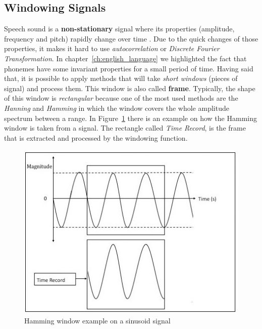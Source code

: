 \subsection{Windowing Signals}
\label{ssubs:windowing_signals}
Speech sound is a \textbf{non-stationary} signal where its properties (amplitude, frequency and pitch) rapidly change over time \cite{windowing_fi}. Due to the quick changes of those properties, it makes it hard to use \textit{autocorrelation} or \textit{Discrete Fourier Transformation}. In chapter~\ref{ch:english_language} we highlighted the fact that phonemes have some invariant properties for a small period of time. Having said that, it is possible to apply methods that will take \textit{short windows} (pieces of signal) and process them. This window is also called \textbf{frame}. Typically, the shape of this window is \textit{rectangular} because one of the most used methods are the \textit{Hanning} and \textit{Hamming} in which the window covers the whole amplitude spectrum between a range. In Figure~\ref{fig:windowing_ex} there is an example on how the Hamming window is taken from a signal. The rectangle called \textit{Time Record}, is the frame that is extracted and processed by the windowing function.

\begin{figure}[!ht]
	\centering
	\includegraphics[scale=0.5]{Figures/windowing.png}
	\caption{Hamming window example on a sinusoid signal}
	\label{fig:windowing_ex}
\end{figure}


